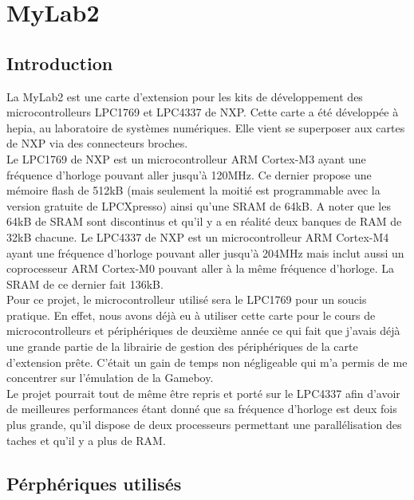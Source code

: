 \documentclass[a4paper]{article}
\begin{document}

\section{MyLab2}
\subsection{Introduction}
La MyLab2 est une carte d'extension pour les kits de développement des microcontrolleurs
LPC1769 et LPC4337 de NXP. Cette carte a été développée à hepia, au laboratoire
de systèmes numériques. Elle vient se superposer aux cartes de NXP via des connecteurs
broches. \\

Le LPC1769 de NXP est un microcontrolleur ARM Cortex-M3 ayant une fréquence d'horloge
pouvant aller jusqu'à 120MHz. Ce dernier propose une mémoire flash de 512kB (mais
seulement la moitié est programmable avec la version gratuite de LPCXpresso) ainsi
qu'une SRAM de 64kB. A noter que les 64kB de SRAM sont discontinus et qu'il y a en
réalité deux banques de RAM de 32kB chacune. 
Le LPC4337 de NXP est un microcontrolleur ARM Cortex-M4 ayant une fréquence d'horloge 
pouvant aller jusqu'à 204MHz mais inclut aussi un coprocesseur ARM Cortex-M0 pouvant
aller à la même fréquence d'horloge. La SRAM de ce dernier fait 136kB. \\

Pour ce projet, le microcontrolleur utilisé sera le LPC1769 pour un soucis pratique.
En effet, nous avons déjà eu à utiliser cette carte pour le cours de microcontrolleurs
et périphériques de deuxième année ce qui fait que j'avais déjà une grande partie de
la librairie de gestion des périphériques de la carte d'extension prête. C'était un
gain de temps non négligeable qui m'a permis de me concentrer sur l'émulation de
la Gameboy. \\

Le projet pourrait tout de même être repris et porté sur le LPC4337 afin d'avoir de
meilleures performances étant donné que sa fréquence d'horloge est deux fois plus
grande, qu'il dispose de deux processeurs permettant une parallélisation des taches
et qu'il y a plus de RAM.


\subsection{Pérphériques utilisés}
\end{document}
